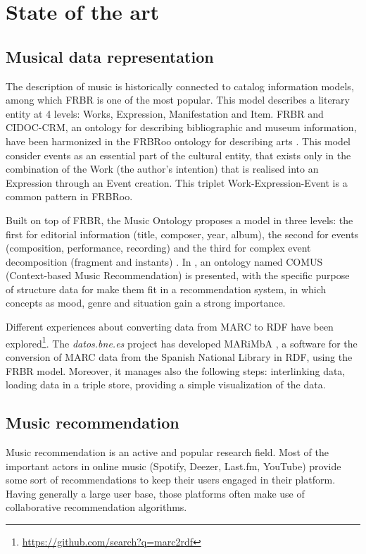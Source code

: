 \documentclass{llncs}
\begin{document}

\section{State of the art}
\label{sec:state-art}

\subsection{Musical data representation}
The description of music is historically connected to catalog information models, among which FRBR is one of the most popular. This model describes a literary entity at 4 levels: Works, Expression, Manifestation and Item. FRBR and CIDOC-CRM, an ontology for describing bibliographic and museum information, have been harmonized in the FRBRoo ontology for describing arts \cite{doerr2008frbroo}. This model consider events as an essential part of the cultural entity, that exists only in the combination of the Work (the author's intention) that is realised into an Expression through an Event creation. This triplet Work-Expression-Event is a common pattern in FRBRoo.

Built on top of FRBR, the Music Ontology proposes a model in three levels: the first for editorial information (title, composer, year, album), the second for events (composition, performance, recording) and the third for complex event decomposition (fragment and instants) \cite{raimond2007music}. In \cite{song2009music}, an ontology named COMUS (Context-based Music Recommendation) is presented, with the specific purpose of structure data for make them fit in a recommendation system, in which concepts as mood, genre and situation gain a strong importance.

Different experiences about converting data from MARC to RDF have been explored\footnote{\url{https://github.com/search?q=marc2rdf}}. The \textit{datos.bne.es} project has developed MARiMbA \cite{greenberg2013datos}, a software for the conversion of MARC data from the Spanish National Library in RDF, using the FRBR model. Moreover, it manages also the following steps: interlinking data, loading data in a triple store, providing a simple visualization of the data.

\subsection{Music recommendation}
Music recommendation is an active and popular research field. Most of the important actors in online music (Spotify, Deezer, Last.fm, YouTube) provide some sort of recommendations to keep their users engaged in their platform. Having generally a large user base, those platforms often make use of collaborative recommendation algorithms. 
\end{document}
